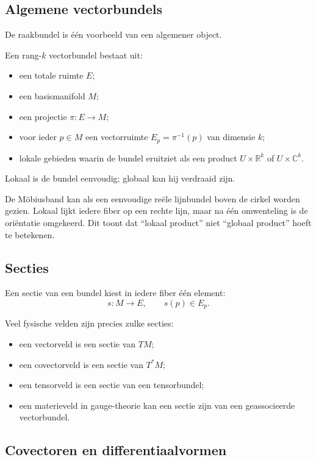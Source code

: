 \documentclass[11pt,a4paper]{article}
\newcommand{\R}{\mathbb{R}}
\newcommand{\C}{\mathbb{C}}
\begin{document}
\subsection{Algemene vectorbundels}

De raakbundel is één voorbeeld van een algemener object.

Een rang-$k$ vectorbundel bestaat uit:
\begin{itemize}
    \item een totale ruimte $E$;
    \item een basismanifold $M$;
    \item een projectie $\pi:E\to M$;
    \item voor ieder $p\in M$ een vectorruimte $E_p=\pi^{-1}(p)$ van dimensie $k$;
    \item lokale gebieden waarin de bundel eruitziet als een product $U\times\R^k$ of $U\times\C^k$.
\end{itemize}

Lokaal is de bundel eenvoudig; globaal kan hij verdraaid zijn.

\begin{voorbeeld}
De Möbiusband kan als een eenvoudige reële lijnbundel boven de cirkel worden gezien. Lokaal lijkt iedere fiber op een rechte lijn, maar na één omwenteling is de oriëntatie omgekeerd. Dit toont dat ``lokaal product'' niet ``globaal product'' hoeft te betekenen.
\end{voorbeeld}

\subsection{Secties}

Een sectie van een bundel kiest in iedere fiber één element:
\[
s:M\to E,
\qquad
s(p)\in E_p.
\]

Veel fysische velden zijn precies zulke secties:
\begin{itemize}
    \item een vectorveld is een sectie van $TM$;
    \item een covectorveld is een sectie van $T^*M$;
    \item een tensorveld is een sectie van een tensorbundel;
    \item een materieveld in gauge-theorie kan een sectie zijn van een geassocieerde vectorbundel.
\end{itemize}

\subsection{Covectoren en differentiaalvormen}
\end{document}
